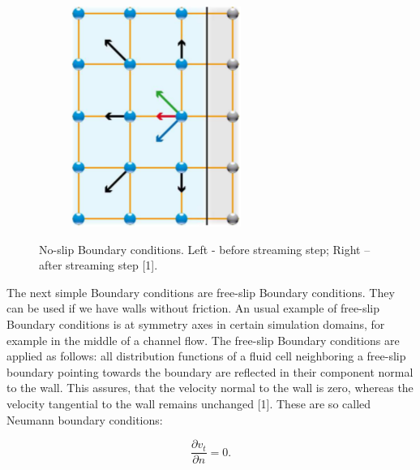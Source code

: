 \begin{figure}[H]
\begin{subfigure}[h]{0.3\textwidth}
    \includegraphics[width=\textwidth]{img/fig8-2.png}
  \end{subfigure}
  \caption{No-slip Boundary conditions. Left - before streaming step; Right – after streaming step [1].}
\end{figure}

The next simple Boundary conditions are free-slip Boundary conditions. They can be used if we have walls without friction. An usual example of free-slip Boundary conditions is at symmetry axes in certain simulation domains, for example in the middle of a channel flow. The free-slip Boundary conditions are applied as follows: all distribution functions of a fluid cell neighboring a free-slip boundary pointing towards the boundary are reflected in their component normal to the wall. This assures, that the velocity normal to the wall is zero, whereas the velocity tangential to the wall remains unchanged [1]. These are so called Neumann boundary conditions:

\begin{equation}
\frac{\partial v_t}{\partial n} = 0.
\end{equation}

